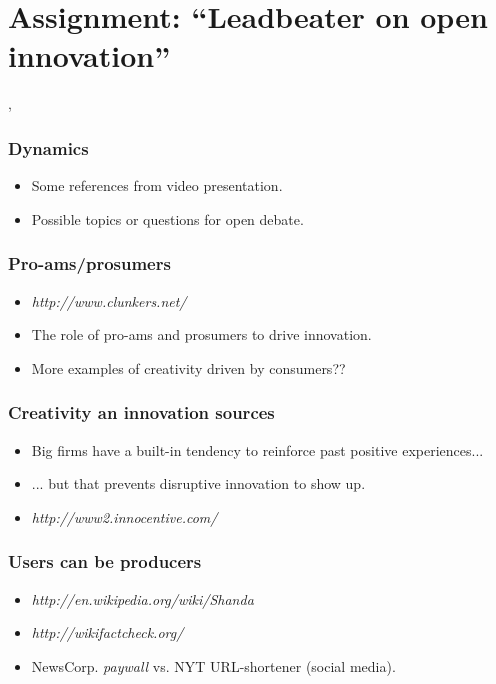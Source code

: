 \section{Assignment: ``Leadbeater on open innovation''},

\begin{frame}
\frametitle{Dynamics}
\begin{itemize}
\item Some references from video presentation.
\item Possible topics or questions for open debate.
\end{itemize}
\end{frame}


\begin{frame}
 \frametitle{Pro-ams/prosumers}
 \begin{itemize}
  \item \textit{http://www.clunkers.net/}
  \item The role of pro-ams and prosumers to drive innovation.
  \item More examples of creativity driven by consumers??
 \end{itemize}


\end{frame}


\begin{frame}
 \frametitle{Creativity an innovation sources}
 \begin{itemize}
  \item Big firms have a built-in tendency to reinforce past positive experiences...
  \item ... but that prevents disruptive innovation to show up.
  \item \textit{http://www2.innocentive.com/}
 \end{itemize}

\end{frame}


\begin{frame}
 \frametitle{Users can be producers}
 \begin{itemize}
  \item \textit{http://en.wikipedia.org/wiki/Shanda}
  \item \textit{http://wikifactcheck.org/}
  \item NewsCorp. \textit{paywall} vs. NYT URL-shortener (social media).
 \end{itemize}

\end{frame}
